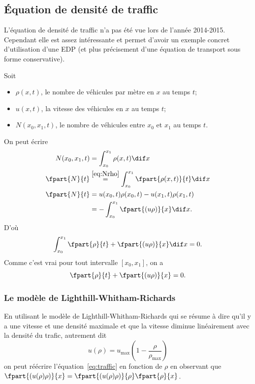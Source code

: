 \subsection{Équation de densité de traffic}
\begin{myrem}
	L'équation de densité de traffic n'a pas été vue lors de
	l'année 2014-2015. Cependant elle est assez intéressante et permet
	d'avoir un exemple concret d'utilisation d'une EDP (et plus précisement
	d'une équation de transport sous forme conservative).
\end{myrem}

\label{sec:traffic}
Soit
\begin{itemize}
  \item $\rho(x, t)$, le nombre de véhicules par mètre
    en $x$ au temps $t$;
  \item $u(x, t)$, la vitesse des véhicules en $x$ au temps $t$;
  \item $N(x_0, x_1, t)$, le nombre de véhicules entre $x_0$ et $x_1$
    au temps $t$.
\end{itemize}
On peut écrire
\begin{align}
  \label{eq:Nrho}
  N(x_0, x_1, t) & = \int_{x_0}^{x_1} \rho(x, t) \dif x\\
  \nonumber
  \fpart{N}{t} & \stackrel{\eqref{eq:Nrho}}{=}
  \int_{x_0}^{x_1} \fpart{\rho(x, t)}{t} \dif x\\
  \nonumber
  \fpart{N}{t} & = u(x_0, t) \rho(x_0, t) - u(x_1, t) \rho(x_1, t)\\
  \nonumber
  & = - \int_{x_0}^{x_1} \fpart{(u\rho)}{x} \dif x.
\end{align}
D'où
\[ \int_{x_0}^{x_1} \fpart{\rho}{t} + \fpart{(u\rho)}{x} \dif x = 0. \]
Comme c'est vrai pour tout intervalle $[x_0, x_1]$, on a
\begin{equation}
  \label{eq:traffic}
  \fpart{\rho}{t} + \fpart{(u\rho)}{x} = 0.
\end{equation}

\subsubsection{Le modèle de Lighthill-Whitham-Richards}
En utilisant le modèle de Lighthill-Whitham-Richards qui
se résume à dire qu'il y a une vitesse et une densité maximale
et que la vitesse diminue linéairement avec la densité du trafic,
autrement dit
\[ u(\rho) =
u_\mathrm{max} \left(1 - \frac{\rho}{\rho_\mathrm{max}}\right) \]
on peut réécrire l'équation~\eqref{eq:traffic} en fonction de $\rho$
en observant que
$\fpart{(u(\rho)\rho)}{x} = \fpart{(u(\rho)\rho)}{\rho}\fpart{\rho}{x}$.

